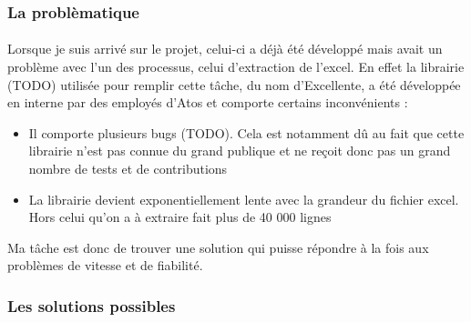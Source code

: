 \documentclass[12pt]{article}
\begin{document}
\begin {sloppypar}
\subsubsection{La problèmatique}
\paragraph {}
Lorsque je suis arrivé sur le projet, celui-ci a déjà été développé mais avait un 
problème avec l'un des processus, celui d'extraction de l'excel. En effet la librairie (TODO)
utilisée pour remplir cette tâche, du nom d'Excellente, a été développée en interne par des 
employés d'Atos et comporte certains inconvénients : 
\begin{itemize}
  \item 
    Il comporte plusieurs bugs (TODO). Cela est notamment dû au fait que cette librairie 
    n'est pas connue du grand publique et ne reçoit donc pas un grand nombre de tests et 
    de contributions 
  \item 
    La librairie devient exponentiellement lente avec la grandeur du fichier excel. Hors
    celui qu'on a à extraire fait plus de 40 000 lignes
\end{itemize}
Ma tâche est donc de trouver une solution qui puisse répondre à la fois aux problèmes
de vitesse et de fiabilité.
\newpage
\subsubsection{Les solutions possibles}

\end{sloppypar}
\end{document}
